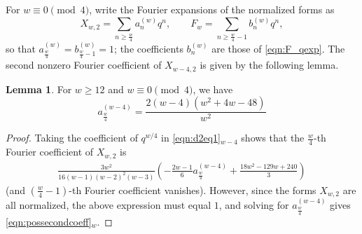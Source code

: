 \documentclass[10pt,reqno]{amsproc}
\newcommand{\1}{\mathds{1}}	%
\theoremstyle{definition}
\newtheorem{lemma}[theorem]{Lemma}
\theoremstyle{remark}
\begin{document}
For $w \equiv 0 \pmod{4}$, write the Fourier expansions of the normalized forms as
\begin{equation}
    \label{eqn:ab_notation}
    X_{w, 2} = \sum_{n \geq \frac{w}{4}} a_{n}^{(w)} q^{n}, \qquad F_{w} = \sum_{n \geq \frac{w}{4}-1} b_{n}^{(w)} q^{n},
\end{equation}
so that $a_{\frac{w}{4}}^{(w)} = b_{\frac{w}{4}-1}^{(w)} = 1$; the coefficients $b_{n}^{(w)}$ are those of \eqref{eqn:F_qexp}.
The second nonzero Fourier coefficient of $X_{w-4, 2}$ is given by the following lemma.

\begin{lemma}
\label{lem:secondcoeff}
For $w \geq 12$ and $w \equiv 0 \pmod{4}$, we have
\begin{equation}
    a_{\frac{w}{4}}^{(w-4)} = \frac{2(w-4)(w^2 + 4w - 48)}{w^2} \label{eqn:possecondcoeff}
\end{equation}
\end{lemma}
\begin{proof}
Taking the coefficient of $q^{w/4}$ in \eqref{eqn:d2eq1}${}_{w-4}$ shows that the $\frac{w}{4}$-th Fourier coefficient of $X_{w, 2}$ is
\begin{align*}
\frac{3w^2}{16(w-1)(w-2)^2 (w-3)} \left( - \frac{2w - 1}{6}a_{\frac{w}{4}}^{(w-4)} + \frac{18w^2 - 129w + 240}{3}\right)
\end{align*}
(and $(\frac{w}{4}-1)$-th Fourier coefficient vanishes).
However, since the forms $X_{w, 2}$ are all normalized, the above expression must equal $1$, and solving for $a_{\frac{w}{4}}^{(w-4)}$ gives \eqref{eqn:possecondcoeff}${}_{w}$.
\end{proof}
\end{document}
